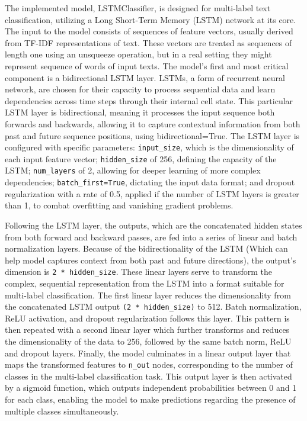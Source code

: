 \documentclass{article}
\begin{document}
The implemented model, LSTMClassifier, is designed for multi-label text classification, utilizing a Long Short-Term Memory (LSTM) network at its core. The input to the model consists of sequences of feature vectors, usually derived from TF-IDF representations of text. These vectors are treated as sequences of length one using an unsqueeze operation, but in a real setting they might represent sequence of words of input texts. The model's first and most critical component is a bidirectional LSTM layer. LSTMs, a form of recurrent neural network, are chosen for their capacity to process sequential data and learn dependencies across time steps through their internal cell state. This particular LSTM layer is bidirectional, meaning it processes the input sequence both forwards and backwards, allowing it to capture contextual information from both past and future sequence positions, using bidirectional=True. The LSTM layer is configured with specific parameters: \texttt{input\_size}, which is the dimensionality of each input feature vector; \texttt{hidden\_size} of 256, defining the capacity of the LSTM; \texttt{num\_layers} of 2, allowing for deeper learning of more complex dependencies; \texttt{batch\_first=True}, dictating the input data format; and dropout regularization with a rate of 0.5, applied if the number of LSTM layers is greater than 1, to combat overfitting and vanishing gradient problems.

Following the LSTM layer, the outputs, which are the concatenated hidden states from both forward and backward passes, are fed into a series of linear and batch normalization layers. Because of the bidirectionality of the LSTM (Which can help model captures context from both past and future directions), the output's dimension is \texttt{2 * hidden\_size}. These linear layers serve to transform the complex, sequential representation from the LSTM into a format suitable for multi-label classification. The first linear layer reduces the dimensionality from the concatenated LSTM output \texttt{(2 * hidden\_size)} to 512. Batch normalization, ReLU activation, and dropout regularization follows this layer. This pattern is then repeated with a second linear layer which further transforms and reduces the dimensionality of the data to 256, followed by the same batch norm, ReLU and dropout layers. Finally, the model culminates in a linear output layer that maps the transformed features to \texttt{n\_out} nodes, corresponding to the number of classes in the multi-label classification task. This output layer is then activated by a sigmoid function, which outputs independent probabilities between 0 and 1 for each class, enabling the model to make predictions regarding the presence of multiple classes simultaneously. 
\end{document}
